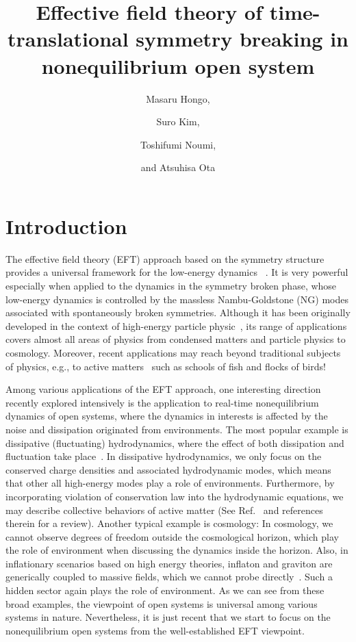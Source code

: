 \documentclass[a4paper,11pt]{article}
\title{
Effective field theory of time-translational symmetry breaking  
in nonequilibrium open system
}
\author[a]{Masaru Hongo,}
\author[b]{Suro Kim,}
\author[b]{Toshifumi Noumi,}
\author[c]{and Atsuhisa Ota}
\affiliation[a]{iTHEMS Program, RIKEN, Wako 351-0198, Japan}
\affiliation[b]{Department of Physics, Kobe University, Kobe 657-8501, Japan}
\affiliation[c]{
Institute for Theoretical Physics and Center for Extreme Matter and Emergent Phenomena,
Utrecht University, Princetonplein 5, 3584 CC Utrecht, The Netherlands}
\begin{document}
 
\maketitle
\flushbottom

\section{Introduction}

The effective field theory (EFT) approach based on the symmetry structure 
provides a universal framework for the low-energy dynamics~
\cite{Manohar:1996cq}. 
It is very powerful especially when applied to the dynamics 
in the symmetry broken phase, whose low-energy dynamics 
is controlled by the massless Nambu-Goldstone (NG) modes 
associated with spontaneously broken symmetries.
Although it has been originally developed in the context of 
high-energy particle physic~\cite{Coleman:1969sm,Callan:1969sn,Weinberg:1978kz},
its range of applications covers  almost all areas of physics
from condensed matters and particle physics to cosmology. 
Moreover, recent applications may reach beyond traditional subjects of  
physics, e.g., to active matters~\cite{TonerTu1,TonerTu2} 
such as schools of fish and flocks of birds!



\medskip
Among various applications of the EFT approach, one interesting direction recently explored intensively is the application to real-time nonequilibrium dynamics of open systems, where the dynamics in interests is affected by the noise and dissipation originated from environments. 
The most popular example is dissipative (fluctuating) hydrodynamics, 
where the effect of both dissipation and fluctuation take place~\cite{Grozdanov:2013dba,Haehl:2015uoc,Crossley:2015evo,Glorioso:2017fpd,Jensen:2017kzi,Haehl:2018lcu,Jensen:2018hse}. 
In dissipative hydrodynamics, 
we only focus on the conserved charge densities and associated hydrodynamic 
modes, which means that other all high-energy modes play a role of environments.
Furthermore, by incorporating violation of conservation law into the hydrodynamic equations, we may describe collective behaviors of active matter
(See Ref.~\cite{RevModPhys.85.1143} and references therein for a review). 
Another typical example is cosmology: 
In cosmology, we cannot observe degrees of freedom outside the cosmological horizon, which play the role of environment when discussing the dynamics inside the horizon. 
Also, in inflationary scenarios based on high energy theories, inflaton and graviton are generically coupled to massive fields, which we cannot probe directly~\cite{Chen:2009zp,Baumann:2011nk,Noumi:2012vr,Arkani-Hamed:2015bza}. Such a hidden sector again plays the role of environment.  
As we can see from these broad examples, 
the viewpoint of open systems is universal among various systems in nature. 
Nevertheless, it is just recent that we start to focus on the 
nonequilibrium open systems from the well-established EFT viewpoint.
\end{document}
